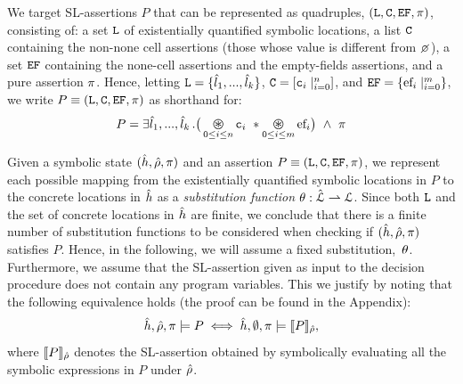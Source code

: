 We target SL-assertions $P$ that can be represented as quadruples,
$(\mathtt{L}, \mathtt{C}, \mathtt{EF}, \pi)$, consisting of: 
 a set $\mathtt{L}$ of existentially quantified symbolic locations, 
 a list $\mathtt{C}$ containing the non-none cell assertions (those whose value is different from $\none$), 
 a set $\mathtt{EF}$ containing the none-cell assertions and the empty-fields assertions, and
 a pure assertion $\pi$. 
Hence, letting $\mathtt{L} = \{ \hat{l}_1, ..., \hat{l}_k \}$, $\mathtt{C} = [ \mathtt{c}_i \mid_{i = 0}^n ]$, and
$\mathtt{EF} = \{\mathtt{\text{ef}}_i \mid_{i = 0}^m \}$, we write $P \equiv (\mathtt{L}, \mathtt{C}, \mathtt{EF}, \pi)$ as shorthand for: 
{\small \begin{equation}
P = \exists \sloc_1, ..., \sloc_k \, . \big( \bigoast_{0 \leq i \leq n} \cell_i \ \sep  \bigoast_{0 \leq i \leq m} \efa_i \big) \ \wedge \ \pfs
\end{equation}}

\vspace{-10pt}
Given a symbolic state $(\hat{h}, \hat\rho, \pi)$ and an assertion $P \equiv (\mathtt{L}, \mathtt{C}, \mathtt{EF}, \pi)$, 
we represent each possible mapping from the existentially quantified symbolic locations in $P$ 
to the concrete locations in $\hat{h}$ as a \emph{substitution function} $\theta : \hat{{\mathcal L}} \rightharpoonup {\mathcal L}$.
Since both $\mathtt{L}$ and the set of concrete locations in $\hat{h}$ 
are finite, we conclude that there is a finite number of substitution functions to be considered 
when checking if $(\hat{h}, \hat\rho, \pi)$ satisfies $P$. 
Hence, in the following, we will assume a fixed substitution,~$\theta$. %
Furthermore, we assume that the SL-assertion given as input to the decision procedure does not contain any program variables. This we justify by noting that the following equivalence holds (the proof can be found in the Appendix):  
\begin{equation}
 \hat{h}, \hat\rho, \pi \models P \iff \hat{h}, \emptyset, \pi \models \llbracket P \rrbracket_{\hat\rho},
\end{equation}
where $\llbracket P \rrbracket_{\hat\rho}$ denotes the SL-assertion obtained by symbolically evaluating 
all the symbolic expressions in $P$ under $\hat\rho$.




